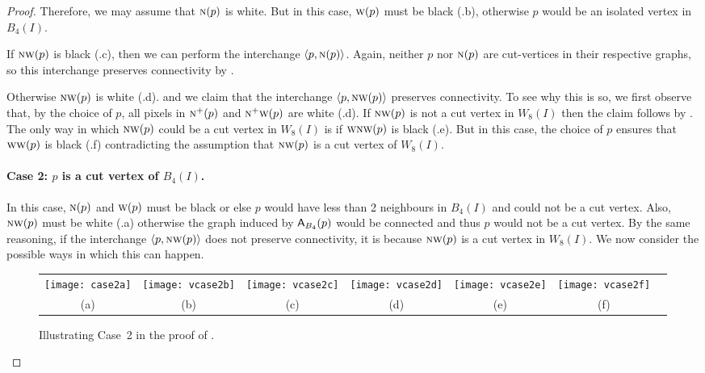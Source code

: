 \documentclass[lotsofwhite,charterfonts]{patmorin}
\newcommand{\N}{\textsc{n}}
\newcommand{\W}{\textsc{w}}
\newcommand{\NW}{\textsc{nw}}
\newcommand{\ic}[2]{\langle #1,#2 \rangle}
\newcommand{\A}[2]{\ensuremath{\protect\textup{\textsf{A}}_{#2}(#1)}}
\begin{document}
\begin{proof}
Therefore, we may assume that $\N(p)$ is white.  But in this case,
$\W(p)$ must be black (.b), otherwise $p$ would be an isolated vertex in $B_4(I)$.

If $\NW(p)$ is black (.c), then we can perform the
interchange $\ic{p}{\N(p)}$.  Again, neither $p$ nor $\N(p)$ are
cut-vertices in their respective graphs, so this interchange preserves
connectivity by .

Otherwise $\NW(p)$ is white (.d). and we claim that
the interchange $\ic{p}{\NW(p)}$ preserves connectivity. To see
why this is so, we first observe that, by the choice of $p$, all
pixels in $\N^+(p)$ and $\N^+\W(p)$ are white (.d). If $\NW(p)$ is not a cut vertex in $W_8(I)$ then the claim follows by .  The only way in which $\NW(p)$ could be a cut vertex in $W_8(I)$ is if $\W\NW(p)$ is black (.e). But in this case, the choice of $p$ ensures that $\W\W(p)$ is black (.f) contradicting the assumption that  $\NW(p)$ is a cut vertex of $W_8(I)$.

\paragraph{Case 2: $p$ is a cut vertex of $B_4(I)$.} In this case,
$\N(p)$ and $\W(p)$ must be black or else $p$ would have less than 2
neighbours in $B_4(I)$ and could not be a cut vertex.  Also, $\NW(p)$
must be white (.a) otherwise the graph induced by
\A{p}{B_4} would be connected and thus $p$ would not be a cut vertex.
By the same reasoning, if the interchange $\ic{p}{\NW(p)}$ does not
preserve connectivity, it is because $\NW(p)$ is a cut vertex in
$W_8(I)$.  We now consider the possible ways in which this can happen.

\begin{figure}[htbp]
\begin{center}
\begin{tabular}{ccccccc}
\texttt{[image: case2a]} & 
\texttt{[image: vcase2b]} & 
\texttt{[image: vcase2c]} & 
\texttt{[image: vcase2d]} & 
\texttt{[image: vcase2e]} & 
\texttt{[image: vcase2f]} \\
(a) & (b) & (c) & (d) & (e) & (f)
\end{tabular}
\end{center}
\caption{Illustrating Case~2 in the proof of .}
\end{figure}


\end{proof}
\end{document}
